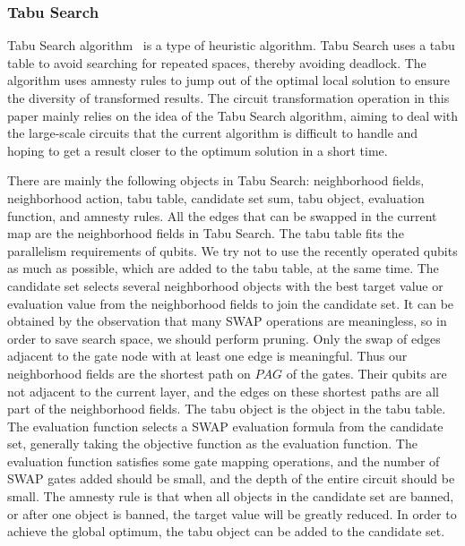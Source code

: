 \documentclass[runningheads]{llncs}
\begin{document}
\subsubsection{Tabu Search}
Tabu Search algorithm~\cite{Glover1990} is a type of heuristic algorithm. Tabu Search uses a tabu table to avoid searching for repeated spaces, thereby avoiding deadlock. The algorithm uses amnesty rules to jump out of the optimal local solution to ensure the diversity of transformed results. The circuit transformation operation in this paper mainly relies on the idea of the Tabu Search algorithm, aiming to deal with the large-scale circuits that the current algorithm is difficult to handle and hoping to get a result closer to the optimum solution in a short time.


There are mainly the following objects in Tabu Search: neighborhood fields, neighborhood action, tabu table, candidate set sum, tabu object, evaluation function, and amnesty rules. All the edges that can be swapped in the current map are the neighborhood fields in Tabu Search. The tabu table fits the parallelism requirements of qubits. We try not to use the recently operated qubits as much as possible, which are added to the tabu table, at the same time. The candidate set selects several neighborhood objects with the best target value or evaluation value from the neighborhood fields to join the candidate set. It can be obtained by the observation that many SWAP operations are meaningless, so in order to save search space, we should perform pruning. Only the swap of edges adjacent to the gate node with at least one edge is meaningful. Thus our neighborhood fields are the shortest path on $PAG$ of the gates. 
Their qubits are not adjacent to the current layer, and the edges on these shortest paths are all part of the neighborhood fields.
The tabu object is the object in the tabu table. The evaluation function selects a SWAP evaluation formula from the candidate set, 
generally taking the objective function as the evaluation function. The evaluation function satisfies some gate mapping operations, 
and the number of SWAP gates added should be small, and the depth of the entire circuit should be small. The amnesty rule is that when all objects in the candidate set are banned,  or after one object is banned, the target value will be greatly reduced. In order to achieve the global optimum, the tabu object can be added to the candidate set.
\end{document}
